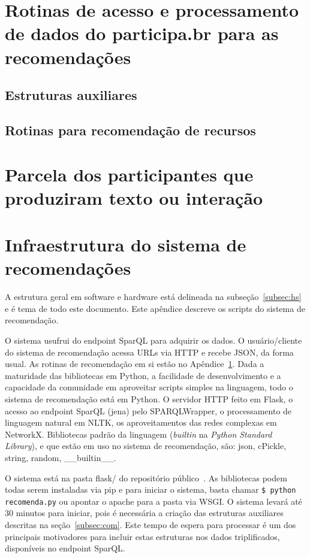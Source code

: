 \documentclass[12pt]{article}
\begin{document}
\section{Rotinas de acesso e processamento de dados do participa.br para as recomendações}\label{sec:algs}
\subsection{Estruturas auxiliares}

\subsection{Rotinas para recomendação de recursos}

\section{Parcela dos participantes que produziram texto ou interação}

\section{Infraestrutura do sistema de recomendações}\label{sec:infra}
A estrutura geral em software e hardware está delineada na subseção~\ref{subsec:hs}
e é tema de todo este documento. Este apêndice descreve os scripts
do sistema de recomendação.

O sistema usufrui do endpoint SparQL para adquirir os dados. O usuário/cliente
do sistema de recomendação acessa URLs via HTTP e recebe JSON, da forma usual.
As rotinas de recomendação em si estão no Apêndice~\ref{sec:algs}. Dada a maturidade
das bibliotecas em Python, a facilidade de desenvolvimento e a capacidade
da comunidade em aproveitar scripts simples na linguagem, todo o sistema de recomendação
está em Python. O servidor HTTP feito em Flask, o acesso ao endpoint SparQL (jena) pelo
SPARQLWrapper, o processamento de linguagem natural em NLTK, os aproveitamentos
das redes complexas em NetworkX. Bibliotecas padrão da linguagem (\emph{builtin} na \emph{Python Standard Library}),
e que estão em uso no sistema de recomendação,
são: json, cPickle, string, random, \_\_builtin\_\_.

O sistema está na pasta flask/ do repositório público~\cite{repoProd4}.
As bibliotecas podem todas serem instaladas via pip e para iniciar o sistema,
basta chamar \texttt{\$ python recomenda.py} ou apontar o apache para a pasta via WSGI.
O sistema levará até 30 minutos para iniciar, pois é necessária a criação das estruturas auxiliares
descritas na seção~\ref{subsec:com}. Este tempo de espera para processar é um dos principais motivadores para incluir estas estruturas nos dados triplificados, disponíveis no endpoint SparQL.
\end{document}
